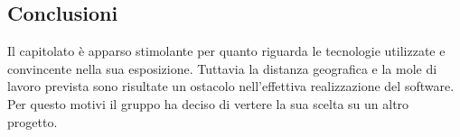     \subsection{Conclusioni}
    Il capitolato è apparso stimolante per quanto riguarda le tecnologie utilizzate e convincente nella sua esposizione. Tuttavia la distanza geografica e la
    mole di lavoro prevista sono risultate un ostacolo nell'effettiva realizzazione del software. Per questo motivi il gruppo ha deciso di vertere la sua scelta
    su un altro progetto.
